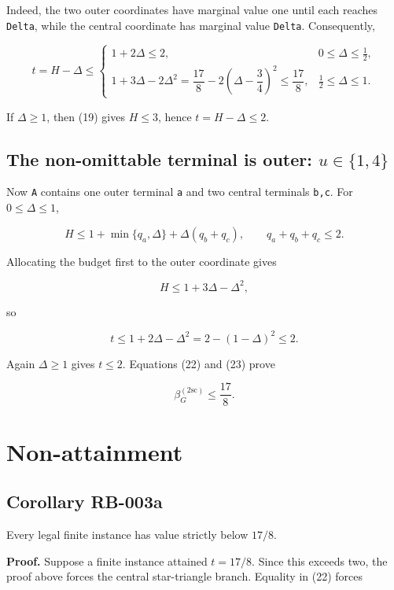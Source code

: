 \documentclass[
  11pt,
]{article}
\begin{document}
Indeed, the two outer coordinates have marginal value one until each
reaches \texttt{Delta}, while the central coordinate has marginal value
\texttt{Delta}. Consequently,

\[
t=H-\Delta\le
\begin{cases}
1+2\Delta\le2,&0\le\Delta\le\tfrac12,\\[1mm]
1+3\Delta-2\Delta^2
=
\dfrac{17}{8}-2\left(\Delta-\dfrac34\right)^2
\le\dfrac{17}{8},
&\tfrac12\le\Delta\le1.
\end{cases}
\tag{22}
\]

If \(\Delta\ge1\), then (19) gives \(H\le3\), hence \(t=H-\Delta\le2\).

\subsection{\texorpdfstring{The non-omittable terminal is outer:
\(u\in\{1,4\}\)}{The non-omittable terminal is outer: u\textbackslash in\textbackslash\{1,4\textbackslash\}}}\label{the-non-omittable-terminal-is-outer-uin14}

Now \texttt{A} contains one outer terminal \texttt{a} and two central
terminals \texttt{b,c}. For \(0\le\Delta\le1\),

\[
H\le
1+\min\{q_a,\Delta\}+\Delta(q_b+q_c),
\qquad q_a+q_b+q_c\le2.
\]

Allocating the budget first to the outer coordinate gives

\[
H\le1+3\Delta-\Delta^2,
\]

so

\[
t\le1+2\Delta-\Delta^2
=2-(1-\Delta)^2
\le2.
\tag{23}
\]

Again \(\Delta\ge1\) gives \(t\le2\). Equations (22) and (23) prove

\[
\beta_G^{(2\mathrm{sc})}\le\frac{17}{8}.
\tag{24}
\]

\section{Non-attainment}\label{non-attainment}

\subsection{Corollary RB-003a}\label{corollary-rb-003a}

Every legal finite instance has value strictly below \(17/8\).

\textbf{Proof.} Suppose a finite instance attained \(t=17/8\). Since
this exceeds two, the proof above forces the central star-triangle
branch. Equality in (22) forces
\end{document}
